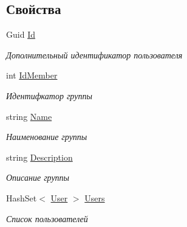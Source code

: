 \subsection*{Свойства}
\begin{DoxyCompactItemize}
\item 
Guid \hyperlink{class_security_1_1_model_1_1_group_a8298621b6bc8f9f880b327bef7c5f479}{Id}
\begin{DoxyCompactList}\small\item\em Дополнительный идентификатор пользователя \end{DoxyCompactList}\item 
int \hyperlink{class_security_1_1_model_1_1_group_aeb049f4c14a5332065c882b9b50c6d58}{Id\+Member}
\begin{DoxyCompactList}\small\item\em Идентифкатор группы \end{DoxyCompactList}\item 
string \hyperlink{class_security_1_1_model_1_1_group_a7901f1a6a674e859e433bcd319b90190}{Name}
\begin{DoxyCompactList}\small\item\em Наименование группы \end{DoxyCompactList}\item 
string \hyperlink{class_security_1_1_model_1_1_group_a0e00a64d8bbc356751c5c4214a199880}{Description}
\begin{DoxyCompactList}\small\item\em Описание группы \end{DoxyCompactList}\item 
Hash\+Set$<$ \hyperlink{class_security_1_1_model_1_1_user}{User} $>$ \hyperlink{class_security_1_1_model_1_1_group_a8e9402d3d8539b04154d8ec8f0e76ea8}{Users}
\begin{DoxyCompactList}\small\item\em Список пользователей \end{DoxyCompactList}\end{DoxyCompactItemize}


